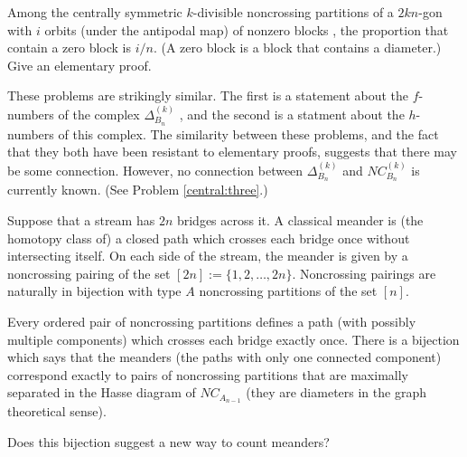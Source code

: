 \documentclass[12pt,letterpaper, reqno]{amsart}
\begin{document}
\begin{problemblock}
\begin{problem}
  Among the centrally symmetric $k$-divisible noncrossing partitions of a $2kn$-gon with $i$ orbits (under the antipodal map) of nonzero blocks \cite{armstrong, reiner}, the proportion that contain a zero block is $i/n$. (A zero block is a block that contains a diameter.) Give an elementary proof.
\end{problem}

\begin{remark}
 These problems are strikingly similar. The first is a statement about the $f$-numbers of the complex $\Delta_{B_n}^{(k)}$ \cite{fomin-reading}, and the second is a statment about the $h$-numbers of this complex. The similarity between these problems, and the fact that they both have been resistant to elementary proofs, suggests that there may be some connection. However, no connection between $\Delta_{B_n}^{(k)}$ and $NC_{B_n}^{(k)}$ is currently known. (See Problem \ref{central:three}.)
\end{remark}

\end{problemblock}

\begin{problemblock}
 Suppose that a stream has $2n$ bridges across it. A classical {\sf meander} is (the homotopy class of) a closed path which crosses each bridge once without intersecting itself. On each side of the stream, the  meander is given by a noncrossing pairing of the set $[2n]:=\{1,2,\ldots,2n\}$. Noncrossing pairings are naturally in bijection with type $A$ noncrossing partitions of the set $[n]$.

Every ordered pair of noncrossing partitions defines a path (with possibly multiple components) which crosses each bridge exactly once. There is a bijection which says that the meanders (the paths with only one connected component) correspond exactly to pairs of noncrossing partitions that are maximally separated in the Hasse diagram of $NC_{A_{n-1}}$ (they are diameters in the graph theoretical sense).

\begin{problem}
 Does this bijection suggest a new way to count meanders?
\end{problem}
\end{problemblock}
\end{document}
